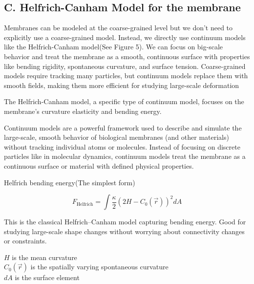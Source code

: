 \documentclass[12pt]{article}
\begin{document}
\begin{flushleft}
\vspace{-1em} 
\subsection*{C. Helfrich-Canham Model for the membrane}
\setlength{\parindent}{30pt}

Membranes can be modeled at the coarse-grained level but we don't need to explicitly use a coarse-grained model. Instead, we directly use continuum models like the Helfrich-Canham model(See Figure 5). We can focus on big-scale behavior and treat the membrane as a smooth, continuous surface with properties like bending rigidity, spontaneous curvature, and surface tension. Coarse-grained models require tracking many particles, but continuum models replace them with smooth fields, making them more efficient for studying large-scale deformation








\setlength{\parindent}{30pt}
The Helfrich-Canham model, a specific type of continuum model, focuses on the membrane's curvature elasticity and bending energy\cite{Bassereau2014}.






Continuum models are a powerful framework used to describe and simulate the large-scale, smooth behavior of biological membranes (and other materials) without tracking individual atoms or molecules. Instead of focusing on discrete particles like in molecular dynamics, continuum models treat the membrane as a continuous surface or material with defined physical properties.



 

Helfrich bending energy(The simplest form)

\vspace{-1em} 


\begin{equation}
F_{\text{Helfrich}} = \int \frac{\kappa}{2} \left( 2H - C_0(\vec{r}) \right)^2 dA
\end{equation}

This is the classical Helfrich–Canham model capturing bending energy. Good for studying large-scale shape changes without worrying about connectivity changes or constraints.


\( H \) is the mean curvature\\
\( C_0(\vec{r}) \) is the spatially varying spontaneous curvature\\
\( dA \) is the surface element\\


\end{flushleft}
\end{document}
